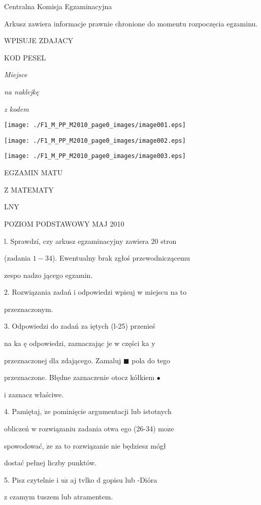 \documentclass[a4paper,12pt]{article}
\begin{document}
Centralna Komisja Egzaminacyjna

Arkusz zawiera informacje prawnie chronione do momentu rozpoczęcia egzaminu.

WPISUJE ZDAJACY

KOD PESEL

{\it Miejsce}

{\it na naklejkę}

{\it z kodem}
\begin{center}
\texttt{[image: ./F1\_M\_PP\_M2010\_page0\_images/image001.eps]}

\texttt{[image: ./F1\_M\_PP\_M2010\_page0\_images/image002.eps]}

\texttt{[image: ./F1\_M\_PP\_M2010\_page0\_images/image003.eps]}
\end{center}
EGZAMIN MATU

Z MATEMATY

LNY

POZIOM PODSTAWOWY  MAJ 2010

l. Sprawdzí, czy arkusz egzaminacyjny zawiera 20 stron

(zadania $1-34$). Ewentualny brak zgłoś przewodniczącemu

zespo nadzo jącego egzamin.

2. Rozwiązania zadań i odpowiedzi wpisuj w miejscu na to

przeznaczonym.

3. Odpowiedzi do zadań za iętych (l-25) przenieś

na ka ę odpowiedzi, zaznaczając je w części ka $\mathrm{y}$

przeznaczonej dla zdającego. Zamaluj $\blacksquare$ pola do tego

przeznaczone. Błędne zaznaczenie otocz kółkiem \fcircle$\bullet$

i zaznacz właściwe.

4. Pamiętaj, $\dot{\mathrm{z}}\mathrm{e}$ pominięcie argumentacji lub istotnych

obliczeń w rozwiązaniu zadania otwa ego (26-34) $\mathrm{m}\mathrm{o}\dot{\mathrm{z}}\mathrm{e}$

spowodować, $\dot{\mathrm{z}}\mathrm{e}$ za to rozwiązanie nie będziesz mógł

dostać pełnej liczby punktów.

5. Pisz czytelnie i $\mathrm{u}\dot{\mathrm{z}}$ aj tvlko $\mathrm{d}$ gopisu lub -Dióra

z czamym tuszem lub atramentem.
\end{document}
